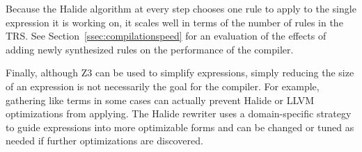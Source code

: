 \documentclass[acmsmall,review,anonymous]{acmart}\settopmatter{printfolios=true,printccs=false,printacmref=false}
\begin{document}
Because the Halide algorithm at every step chooses one rule to apply to the single expression it is working on, it scales well in terms of the number of rules in the TRS. See Section~\ref{ssec:compilationspeed} for an evaluation of the effects of adding newly synthesized rules on the performance of the compiler. 

Finally, although Z3 can be used to simplify expressions, simply reducing the size of an expression is not necessarily the goal for the compiler. For example, gathering like terms in some cases can actually prevent Halide or LLVM optimizations from applying. The Halide rewriter uses a domain-specific strategy to guide expressions into more optimizable forms and can be changed or tuned as needed if further optimizations are discovered. 







\end{document}
